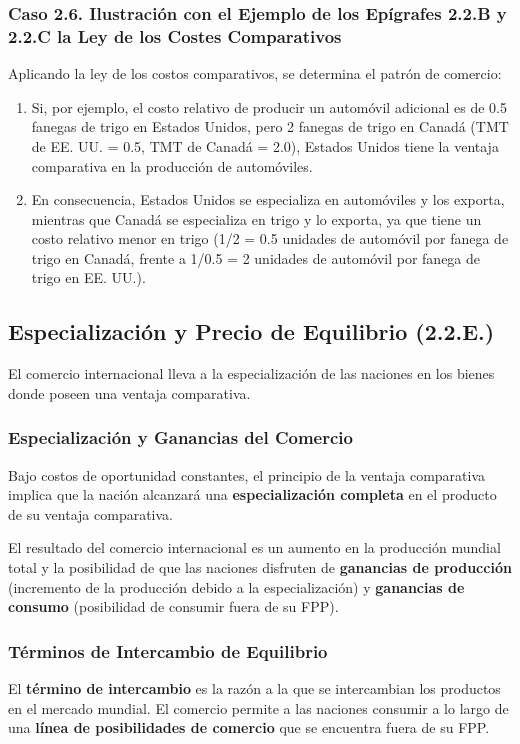 \subsubsection{Caso 2.6. Ilustración con el Ejemplo de los Epígrafes 2.2.B y 2.2.C la Ley de los Costes Comparativos}
Aplicando la ley de los costos comparativos, se determina el patrón de comercio:
\begin{enumerate}
    \item Si, por ejemplo, el costo relativo de producir un automóvil adicional es de 0.5 fanegas de trigo en Estados Unidos, pero 2 fanegas de trigo en Canadá (TMT de EE. UU. = 0.5, TMT de Canadá = 2.0), Estados Unidos tiene la ventaja comparativa en la producción de automóviles.
    \item En consecuencia, Estados Unidos se especializa en automóviles y los exporta, mientras que Canadá se especializa en trigo y lo exporta, ya que tiene un costo relativo menor en trigo (1/2 = 0.5 unidades de automóvil por fanega de trigo en Canadá, frente a 1/0.5 = 2 unidades de automóvil por fanega de trigo en EE. UU.).
\end{enumerate}

\subsection{Especialización y Precio de Equilibrio (2.2.E.)}
El comercio internacional lleva a la especialización de las naciones en los bienes donde poseen una ventaja comparativa.

\subsubsection{Especialización y Ganancias del Comercio}
Bajo costos de oportunidad constantes, el principio de la ventaja comparativa implica que la nación alcanzará una \textbf{especialización completa} en el producto de su ventaja comparativa.

El resultado del comercio internacional es un aumento en la producción mundial total y la posibilidad de que las naciones disfruten de \textbf{ganancias de producción} (incremento de la producción debido a la especialización) y \textbf{ganancias de consumo} (posibilidad de consumir fuera de su FPP).

\subsubsection{Términos de Intercambio de Equilibrio}
El \textbf{término de intercambio} es la razón a la que se intercambian los productos en el mercado mundial. El comercio permite a las naciones consumir a lo largo de una \textbf{línea de posibilidades de comercio} que se encuentra fuera de su FPP.

